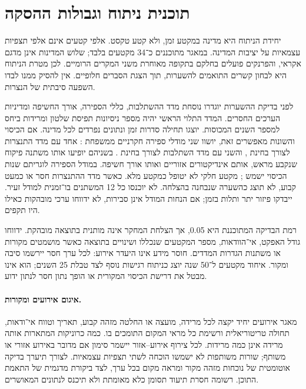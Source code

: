 \section{תוכנית ניתוח וגבולות ההסקה}
\label{sec:alt-statistics}

יחידת הניתוח היא מדינה במקטע זמן, ולא קטע טקסט. אלפי קטעים אינם אלפי תצפיות עצמאיות על יציבות המדינה. במאגר מתוכננים כ־34 מקטעים בלבד; שלוש המדינות אינן מדגם אקראי, והפרנקים פועלים בחלקם בתקופה מאוחרת משני המקרים הרומיים. לכן מטרת הניתוח היא לבחון קשרים התואמים להשערות, תוך הצגת הסברים חלופיים. אין להסיק ממנו לבדו השפעה סיבתית של הנצרות.

לפני בדיקת ההשערות יוגדרו נוסחת מדד ההשתלבות, כללי הספירה, אורך החשיפה ומדיניות הערכים החסרים. המדד התלוי הראשי יהיה מספר ניסיונות תפיסת שלטון ומרידות ביחס למספר השנים המכוסות. יוצגו תחילה סדרות זמן ונתונים נפרדים לכל מדינה. אם הכיסוי והשונות מאפשרים זאת, יושוו שני מודלי ספירה חקרניים ממשפחת : אחד עם מדד התנצרות לצורך בחינת , והשני עם מדד השתלבות לצורך בחינת . בשניהם יופיעו אותו משתנה פיקוח שנקבע מראש, אותם אינדיקטורים אזוריים ואותו אורך חשיפה. במודל הספירה לוגריתם שנות הכיסוי ישמש ; מקטע חלקי לא יטופל כמקטע מלא. כאשר מדד ההתנצרות חסר או כמעט קבוע, לא תוצג  כהשערה שנבחנה בהצלחה. לא יוכנסו כל 12 המשתנים בו־זמנית למודל זעיר. ייבדקו פיזור יתר ותלות בזמן; אם הנחות המודל אינן סבירות, לא ידווחו ערכי מובהקות כאילו היו תקפים.

רמת הבדיקה המתוכננת היא 0.05, אך הצלחת המחקר אינה מותנית בתוצאה מובהקת. ידווחו גודל האפקט, אי־הוודאות, מספר המקטעים שנכללו ושינויים בתוצאה כאשר מושמטים מקורות או משתנות הגדרות המדדים. חוסר מידע אינו היעדר אירוע: לכל ערך חסר יירשמו סיבה ומקור. איחוד מקטעים ל־50 שנה יוצג כניתוח רגישות נוסף לצד טבלת 25 השנים; הוא אינו מבטל את דרישת הכיסוי המקורית או הופך נתון חסר לנתון ידוע.


\paragraph{איגום אירועים ומקורות.} מאגר אירועים יחיד יקצה לכל מרידה, מועצה או החלטה מזהה קבוע, תאריך וטווח אי־ודאות, תחולה טריטוריאלית ורשימת כל מראי המקום התומכים בו. כמה כרוניקות המתארות אותה מרידה אינן כמה מרידות. לכל צירוף אירוע–אזור יישמר סימון אם מדובר באירוע אזורי או משותף; שורות משותפות לא ישמשו הוכחה לשתי תצפיות עצמאיות. לצורך  תיערך בדיקה אוטומטית של נוכחות מזהה מקור ומראה מקום בכל ערך, לצד ביקורת מדגמית של התאמת התוכן. רשומה חסרת תיעוד תסומן כלא מאומתת ולא תיכנס לנתונים המאושרים.
